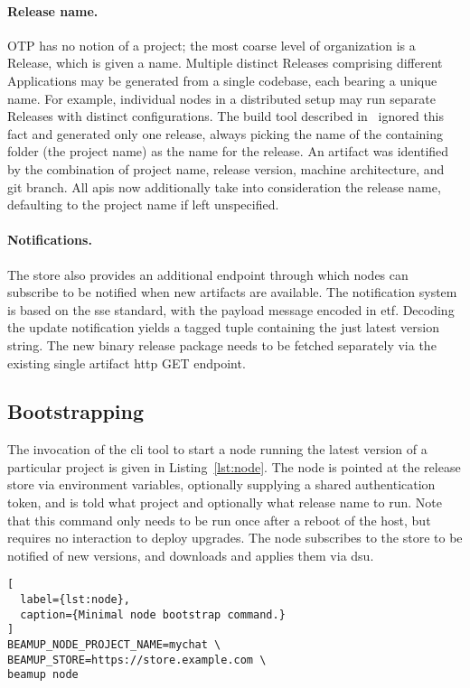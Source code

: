 \paragraph{Release name.}
OTP has no notion of a project; the most coarse level of organization is a Release, which is given a name. Multiple distinct Releases comprising different Applications may be generated from a single codebase, each bearing a unique name. For example, individual nodes in a distributed setup may run separate Releases with distinct configurations. The build tool described in~\cite{zak18} ignored this fact and generated only one release, always picking the name of the containing folder (the project name) as the name for the release. An artifact was identified by the combination of project name, release version, machine architecture, and git branch. All \acrshort{api}s now additionally take into consideration the release name, defaulting to the project name if left unspecified.

\paragraph{Notifications.} The store also provides an additional endpoint through which nodes can subscribe to be notified when new artifacts are available. The notification system is based on the \acrfull{sse} standard, with the payload message encoded in \acrfull{etf}. Decoding the update notification yields a tagged tuple containing the just latest version string. The new binary release package needs to be fetched separately via the existing single artifact \acrshort{http} GET endpoint.



\subsection{Bootstrapping}
The invocation of the \acrshort{cli} tool to start a node running the latest version of a particular project is given in Listing~\ref{lst:node}. The node is pointed at the release store via environment variables, optionally supplying a shared authentication token, and is told what project and optionally what release name to run. Note that this command only needs to be run once after a reboot of the host, but requires no interaction to deploy upgrades. The node subscribes to the store to be notified of new versions, and downloads and applies them via \acrshort{dsu}.

\begin{lstlisting}[
  label={lst:node},
  caption={Minimal node bootstrap command.}
]
BEAMUP_NODE_PROJECT_NAME=mychat \
BEAMUP_STORE=https://store.example.com \
beamup node
\end{lstlisting}

